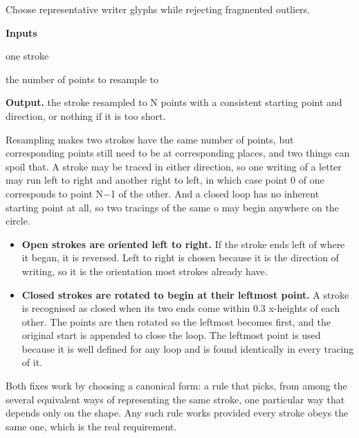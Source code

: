 Choose representative writer glyphs while rejecting fragmented outliers.




\noindent\textbf{Inputs}
\begin{description}[leftmargin=2.2em,style=nextline,font=\normalfont\ttfamily]\setlength\itemsep{1pt}
  \item[{s}] \normalfont one stroke
  \item[{N}] \normalfont the number of points to resample to
\end{description}

\noindent\textbf{Output.} the stroke resampled to N points with a consistent starting point and direction, or nothing if it is too short.


Resampling makes two strokes have the same number of points, but corresponding points still need to be at corresponding places, and two things can spoil that. A stroke may be traced in either direction, so one writing of a letter may run left to right and another right to left, in which case point 0 of one corresponds to point N$-$1 of the other. And a closed loop has no inherent starting point at all, so two tracings of the same o may begin anywhere on the circle.



\begin{itemize}\setlength\itemsep{0pt}
  \item \textbf{Open strokes are oriented left to right.} If the stroke ends left of where it began, it is reversed. Left to right is chosen because it is the direction of writing, so it is the orientation most strokes already have.
  \item \textbf{Closed strokes are rotated to begin at their leftmost point.} A stroke is recognised as closed when its two ends come within 0.3 x-heights of each other. The points are then rotated so the leftmost becomes first, and the original start is appended to close the loop. The leftmost point is used because it is well defined for any loop and is found identically in every tracing of it.
\end{itemize}
Both fixes work by choosing a canonical form: a rule that picks, from among the several equivalent ways of representing the same stroke, one particular way that depends only on the shape. Any such rule works provided every stroke obeys the same one, which is the real requirement.


